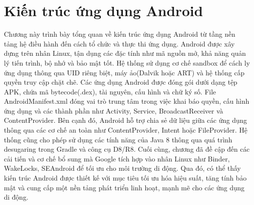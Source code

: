 \chapter{Kiến trúc ứng dụng Android}
\label{chap:Chap}
Chương này trình bày tổng quan về kiến trúc ứng dụng Android từ tầng nền tảng hệ điều hành đến cách tổ chức và thực thi ứng dụng. Android được xây dựng trên nhân Linux, tận dụng các đặc tính như mã nguồn mở, khả năng quản lý tiến trình, bộ nhớ và bảo mật tốt. Hệ thống sử dụng cơ chế sandbox để cách ly ứng dụng thông qua UID riêng biệt, máy ảo(Dalvik hoặc ART) và hệ thống cấp quyền truy cập chặt chẽ. Các ứng dụng Android được đóng gói dưới dạng tệp APK, chứa mã bytecode(.dex), tài nguyên, cấu hình và chữ ký số. File AndroidManifest.xml đóng vai trò trung tâm trong việc khai báo quyền, cấu hình ứng dụng và các thành phần như Activity, Service, BroadcastReceiver và ContentProvider. Bên cạnh đó, Android hỗ trợ chia sẻ dữ liệu giữa các ứng dụng thông qua các cơ chế an toàn như ContentProvider, Intent hoặc FileProvider. Hệ thống cũng cho phép sử dụng các tính năng của Java 8 thông qua quá trình desugaring trong Gradle và công cụ D8/R8. Cuối cùng, chương đã đề cập đến các cải tiến và cơ chế bổ sung mà Google tích hợp vào nhân Linux như Binder, WakeLocks, SEAndroid để tối ưu cho môi trường di động. Qua đó, có thể thấy kiến trúc Android được thiết kế với mục tiêu tối ưu hóa hiệu suất, tăng tính bảo mật và cung cấp một nền tảng phát triển linh hoạt, mạnh mẽ cho các ứng dụng di động.




